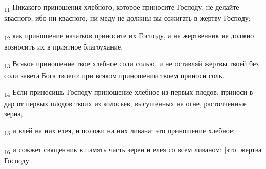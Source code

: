 \begin{tcolorbox}
\textsubscript{11} Никакого приношения хлебного, которое приносите Господу, не делайте квасного, ибо ни квасного, ни меду не должны вы сожигать в жертву Господу;
\end{tcolorbox}
\begin{tcolorbox}
\textsubscript{12} как приношение начатков приносите их Господу, а на жертвенник не должно возносить их в приятное благоухание.
\end{tcolorbox}
\begin{tcolorbox}
\textsubscript{13} Всякое приношение твое хлебное соли солью, и не оставляй жертвы твоей без соли завета Бога твоего: при всяком приношении твоем приноси соль.
\end{tcolorbox}
\begin{tcolorbox}
\textsubscript{14} Если приносишь Господу приношение хлебное из первых плодов, приноси в дар от первых плодов твоих из колосьев, высушенных на огне, растолченные зерна,
\end{tcolorbox}
\begin{tcolorbox}
\textsubscript{15} и влей на них елея, и положи на них ливана: это приношение хлебное;
\end{tcolorbox}
\begin{tcolorbox}
\textsubscript{16} и сожжет священник в память часть зерен и елея со всем ливаном: [это] жертва Господу.
\end{tcolorbox}
